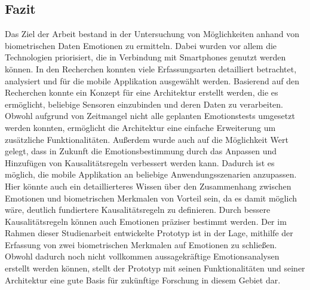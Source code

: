 \subsection{Fazit}
Das Ziel der Arbeit bestand in der Untersuchung von Möglichkeiten anhand von biometrischen Daten Emotionen zu ermitteln. Dabei wurden vor allem die Technologien priorisiert, die in Verbindung mit Smartphones genutzt werden können. In den Recherchen konnten viele Erfassungsarten detailliert betrachtet, analysiert und für die mobile Applikation ausgewählt werden. Basierend auf den Recherchen konnte ein Konzept für eine Architektur erstellt werden, die es ermöglicht, beliebige Sensoren einzubinden und deren Daten zu verarbeiten. Obwohl aufgrund von Zeitmangel nicht alle geplanten Emotionstests umgesetzt werden konnten, ermöglicht die Architektur eine einfache Erweiterung um zusätzliche Funktionalitäten. \newline
Außerdem wurde auch auf die Möglichkeit Wert gelegt, dass in Zukunft die Emotionsbestimmung durch das Anpassen und Hinzufügen von Kausalitätsregeln verbessert werden kann. Dadurch ist es möglich, die mobile Applikation an beliebige Anwendungsszenarien anzupassen. Hier könnte auch ein detaillierteres Wissen über den Zusammenhang zwischen Emotionen und biometrischen Merkmalen von Vorteil sein, da es damit möglich wäre, deutlich fundiertere Kausalitätsregeln zu definieren. Durch bessere Kausalitätsregeln können auch Emotionen präziser bestimmt werden.\newline
Der im Rahmen dieser Studienarbeit entwickelte Prototyp ist in der Lage, mithilfe der Erfassung von zwei biometrischen Merkmalen auf Emotionen zu schließen. Obwohl dadurch noch nicht vollkommen aussagekräftige Emotionsanalysen erstellt werden können, stellt der Prototyp mit seinen Funktionalitäten und seiner Architektur eine gute Basis für zukünftige Forschung in diesem Gebiet dar.